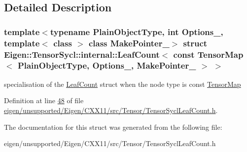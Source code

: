 \subsection{Detailed Description}
\subsubsection*{template$<$typename Plain\+Object\+Type, int Options\+\_\+, template$<$ class $>$ class Make\+Pointer\+\_\+$>$\newline
struct Eigen\+::\+Tensor\+Sycl\+::internal\+::\+Leaf\+Count$<$ const Tensor\+Map$<$ Plain\+Object\+Type, Options\+\_\+, Make\+Pointer\+\_\+ $>$ $>$}

specialisation of the \hyperlink{struct_eigen_1_1_tensor_sycl_1_1internal_1_1_leaf_count}{Leaf\+Count} struct when the node type is const \hyperlink{class_eigen_1_1_tensor_map}{Tensor\+Map} 

Definition at line \hyperlink{eigen_2unsupported_2_eigen_2_c_x_x11_2src_2_tensor_2_tensor_sycl_leaf_count_8h_source_l00048}{48} of file \hyperlink{eigen_2unsupported_2_eigen_2_c_x_x11_2src_2_tensor_2_tensor_sycl_leaf_count_8h_source}{eigen/unsupported/\+Eigen/\+C\+X\+X11/src/\+Tensor/\+Tensor\+Sycl\+Leaf\+Count.\+h}.



The documentation for this struct was generated from the following file\+:\begin{DoxyCompactItemize}
\item 
eigen/unsupported/\+Eigen/\+C\+X\+X11/src/\+Tensor/\+Tensor\+Sycl\+Leaf\+Count.\+h\end{DoxyCompactItemize}
